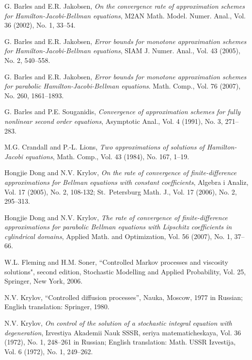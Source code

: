 \documentclass[11pt, reqno]{amsart}
\theoremstyle{definition}
\theoremstyle{remark}
\begin{document}
\begin{thebibliography}{mm}

 G. Barles and E.R. Jakobsen,  {\em
  On the convergence rate of
 approximation schemes for Hamilton-Jacobi-Bellman equations\/},
 M2AN Math. Model. Numer. Anal., Vol. 36 (2002), 
No. 1, 33--54.

 G. Barles and E.R. Jakobsen,  {\em Error bounds for monotone 
approximation schemes for Hamilton-Jacobi-Bellman equations\/},
 SIAM J. Numer. Anal., Vol. 43 (2005), No. 2, 
540--558.

 G. Barles and E.R. Jakobsen, 
{\em Error bounds for monotone
approximation schemes for parabolic Hamilton-Jacobi-Bellman 
equations\/}. Math.
Comp., Vol. 76 (2007), No. 260, 1861--1893.

 G. Barles and P.E. Souganidis, {\em
Convergence of approximation 
schemes for fully nonlinear second
order equations\/}, Asymptotic Anal., Vol. 4 (1991), No. 3, 271--283.

 M.G. Crandall and P.-L. Lions,  {\em
Two approximations of solutions of Hamilton-Jacobi equations\/},
Math. Comp., Vol. 43 (1984), No. 167, 1--19.

 Hongjie Dong and N.V. Krylov,
 {\em
On the rate of convergence
of finite-difference approximations for Bellman equations with
constant coefficients\/},  Algebra i Analiz, Vol. 17 (2005),
 No. 2, 108-132; St.~Petersburg
Math. J., Vol. 17 (2006), No. 2, 295--313.

 Hongjie Dong and N.V. Krylov,
{\em  The rate of convergence
of finite-difference approximations for parabolic Bellman equations
with Lipschitz coefficients in cylindrical
domains\/},   Applied Math. and Optimization, Vol. 56 (2007), No. 1,
37--66.

 W.L. Fleming and H.M. Soner,  
 ``Controlled Markov processes and
viscosity solutions", second edition, Stochastic Modelling and
Applied Probability, Vol. 25, Springer, New York, 2006.

 N.V. Krylov,  ``Controlled diffusion processes'', 
Nauka, Moscow,  1977 in Russian; English translation:
 Springer,
1980.

 N.V. Krylov, {\em
   On control of the solution of a stochastic integral
equation with degeneration\/}, 
Izvestiya Akademii Nauk SSSR, seriya matematicheskaya,
Vol. 36 (1972), No. 1,  248--261 in Russian; English translation:
Math. USSR
Izvestija, Vol. 6 (1972),  No. 1, 249--262.


\end{thebibliography}
\end{document}
